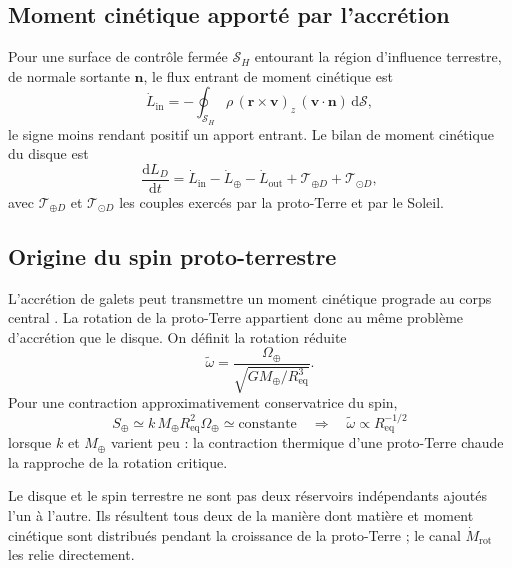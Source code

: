 \documentclass[11pt,a4paper,openany]{report}
\newcommand{\Mt}{M_{\oplus}}
\newcommand{\Req}{R_{\mathrm{eq}}}
\newcommand{\dd}{\mathrm{d}}
\begin{document}
\subsection{Moment cinétique apporté par l'accrétion}

Pour une surface de contrôle fermée $\mathcal{S}_H$ entourant la région d'influence terrestre, de
normale sortante $\mathbf{n}$, le flux entrant de moment cinétique est
\begin{equation}
\dot L_{\mathrm{in}}=-\oint_{\mathcal{S}_H}\rho\,(\mathbf{r}\times\mathbf{v})_z\,
(\mathbf{v}\cdot\mathbf{n})\,\dd\mathcal{S},
\label{eq:Lin}
\end{equation}
le signe moins rendant positif un apport entrant. Le bilan de moment cinétique du disque est
\begin{equation}
\frac{\dd L_D}{\dd t}=\dot L_{\mathrm{in}}-\dot L_{\oplus}-\dot L_{\mathrm{out}}
+\mathcal{T}_{\oplus D}+\mathcal{T}_{\odot D},
\label{eq:bilanL}
\end{equation}
avec $\mathcal{T}_{\oplus D}$ et $\mathcal{T}_{\odot D}$ les couples exercés par la proto-Terre et par
le Soleil.

\subsection{Origine du spin proto-terrestre}

L'accrétion de galets peut transmettre un moment cinétique prograde au corps central
\cite{JohansenLacerda2010,Visser2020}. La rotation de la proto-Terre appartient donc au même
problème d'accrétion que le disque. On définit la rotation réduite
\begin{equation}
\tilde\omega=\frac{\Omega_\oplus}{\sqrt{G\Mt/\Req^3}}.
\label{eq:omegatilde}
\end{equation}
Pour une contraction approximativement conservatrice du spin,
\begin{equation}
S_\oplus\simeq k\,\Mt\Req^2\Omega_\oplus\simeq\text{constante}
\quad\Longrightarrow\quad
\tilde\omega\propto\Req^{-1/2}
\label{eq:spin}
\end{equation}
lorsque $k$ et $\Mt$ varient peu : la contraction thermique d'une proto-Terre chaude la
rapproche de la rotation critique.

\begin{ideephys}
Le disque et le spin terrestre ne sont pas deux réservoirs indépendants ajoutés l'un à l'autre. Ils
résultent tous deux de la manière dont matière et moment cinétique sont distribués pendant la
croissance de la proto-Terre ; le canal $\dot M_{\mathrm{rot}}$ les relie directement.
\end{ideephys}
\end{document}
